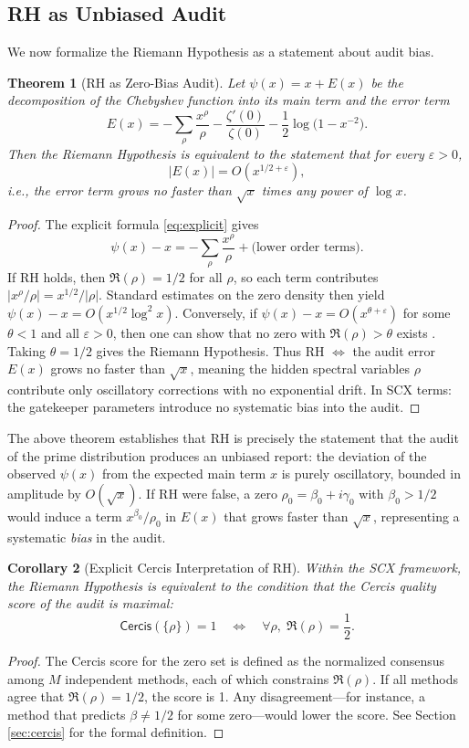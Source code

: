 \documentclass[12pt,a4paper]{article}
\newtheorem{theorem}{Theorem}[section]
\newtheorem{corollary}[theorem]{Corollary}
\theoremstyle{remark}
\newcommand{\Cercis}{\textsf{Cercis}}
\begin{document}
\subsection{RH as Unbiased Audit}
\label{sec:rh_audit}
We now formalize the Riemann Hypothesis as a statement about audit bias.
\begin{theorem}[RH as Zero-Bias Audit]
\label{thm:rh_audit}
Let $\psi(x) = x + E(x)$ be the decomposition of the Chebyshev function into
its main term and the error term
\[
E(x) = -\sum_{\rho} \frac{x^{\rho}}{\rho}
- \frac{\zeta'(0)}{\zeta(0)} - \frac12 \log\!\bigl(1 - x^{-2}\bigr).
\]
Then the Riemann Hypothesis is equivalent to the statement that for every
$\varepsilon > 0$,
\begin{equation}
\label{eq:rh_bias}
\left| E(x) \right| = O\!\left(x^{1/2 + \varepsilon}\right),
\end{equation}
i.e., the error term grows no faster than $\sqrt{x}$ times any power of
$\log x$.
\end{theorem}
\begin{proof}
The explicit formula \eqref{eq:explicit} gives
\[
\psi(x) - x = -\sum_{\rho} \frac{x^{\rho}}{\rho} + \text{(lower order terms)}.
\]
If RH holds, then $\Re(\rho) = 1/2$ for all $\rho$, so each term contributes
$|x^{\rho}/\rho| = x^{1/2}/|\rho|$. Standard estimates on the zero density
\cite{Titchmarsh1986} then yield $\psi(x) - x = O(x^{1/2}\log^2 x)$.
Conversely, if $\psi(x) - x = O(x^{\theta + \varepsilon})$ for some
$\theta < 1$ and all $\varepsilon > 0$, then one can show that no zero with
$\Re(\rho) > \theta$ exists \cite{Ingham1932}. Taking $\theta = 1/2$ gives
the Riemann Hypothesis.
Thus RH $\iff$ the audit error $E(x)$ grows no faster than $\sqrt{x}$,
meaning the hidden spectral variables $\rho$ contribute only oscillatory
corrections with no exponential drift. In SCX terms: the gatekeeper
parameters introduce no systematic bias into the audit.
\end{proof}
The above theorem establishes that RH is precisely the statement that the
audit of the prime distribution produces an unbiased report: the deviation
of the observed $\psi(x)$ from the expected main term $x$ is purely
oscillatory, bounded in amplitude by $O(\sqrt{x})$. If RH were false, a
zero $\rho_0 = \beta_0 + i\gamma_0$ with $\beta_0 > 1/2$ would induce a
term $x^{\beta_0}/\rho_0$ in $E(x)$ that grows faster than $\sqrt{x}$,
representing a systematic \emph{bias} in the audit.
\begin{corollary}[Explicit Cercis Interpretation of RH]
\label{cor:cercis_rh}
Within the SCX framework, the Riemann Hypothesis is equivalent to the
condition that the Cercis quality score of the audit is maximal:
\[
\Cercis(\{\rho\}) = 1 \quad\Longleftrightarrow\quad
\forall\rho,\; \Re(\rho) = \frac12.
\]
\end{corollary}
\begin{proof}
The Cercis score for the zero set is defined as the normalized consensus
among $M$ independent methods, each of which constrains $\Re(\rho)$.
If all methods agree that $\Re(\rho) = 1/2$, the score is 1. Any
disagreement---for instance, a method that predicts $\beta \neq 1/2$ for
some zero---would lower the score. See Section \ref{sec:cercis} for the
formal definition.
\end{proof}
\end{document}
